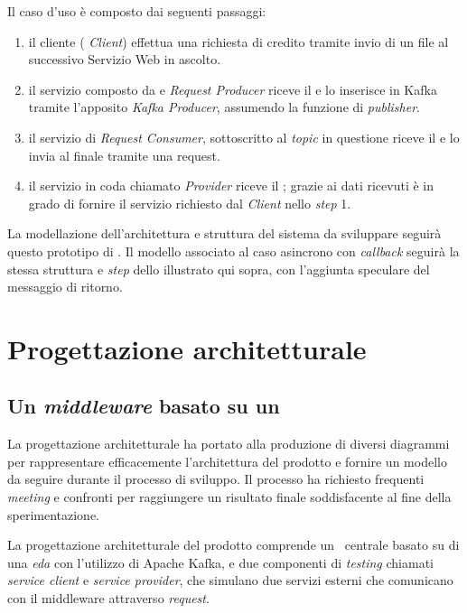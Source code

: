 \noindent
Il caso d'uso è composto dai seguenti passaggi:
\begin{enumerate}
  \item il cliente (\textit{ Client}) effettua una richiesta di credito tramite invio di un file  al successivo Servizio Web in ascolto.
  \item il servizio composto da   e \textit{Request Producer} riceve il  e lo inserisce in Kafka tramite l'apposito \textit{Kafka Producer}, assumendo la funzione di \textit{publisher}.
  \item il servizio di \textit{Request Consumer}, sottoscritto al \textit{topic} in questione riceve il  e lo invia al  finale tramite una  request.
  \item il servizio in coda chiamato  \textit{Provider} riceve il ; grazie ai dati ricevuti è in grado di fornire il servizio richiesto dal \textit{Client} nello \textit{step} 1.
\end{enumerate}

La modellazione dell'architettura e struttura del sistema da sviluppare seguirà questo prototipo di .
Il modello associato al caso asincrono con \textit{callback} seguirà la stessa struttura e \textit{step} dello  illustrato qui sopra, con l'aggiunta speculare del messaggio di ritorno.

\section{Progettazione architetturale}\label{sec:progettazione}
\subsection{Un \textit{middleware} basato su un }

La progettazione architetturale ha portato alla produzione di diversi diagrammi  per rappresentare efficacemente l'architettura del prodotto e fornire un modello da seguire durante il processo di sviluppo.
Il processo ha richiesto frequenti \textit{meeting} e confronti per raggiungere un risultato finale soddisfacente al fine della sperimentazione.

La progettazione architetturale del prodotto comprende un \middleware\ centrale basato su di una \textit{\acrlong{eda}} con l'utilizzo di Apache Kafka, e due componenti di \textit{testing} chiamati \textit{service client} e \textit{service provider}, che simulano due servizi esterni che comunicano con il middleware attraverso  \textit{request}.


